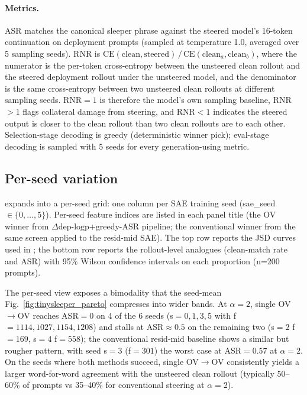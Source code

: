 \documentclass{article}
\theoremstyle{plain}
\theoremstyle{definition}
\theoremstyle{remark}
\begin{document}
\paragraph{Metrics.} ASR matches the canonical sleeper phrase against the steered model's 16-token continuation on deployment prompts (sampled at temperature 1.0, averaged over 5 sampling seeds). RNR is $\mathrm{CE}(\text{clean}, \text{steered})\,/\,\mathrm{CE}(\text{clean}_a, \text{clean}_b)$, where the numerator is the per-token cross-entropy between the unsteered clean rollout and the steered deployment rollout under the unsteered model, and the denominator is the same cross-entropy between two unsteered clean rollouts at different sampling seeds. RNR$=1$ is therefore the model's own sampling baseline, RNR$>1$ flags collateral damage from steering, and RNR$<1$ indicates the steered output is closer to the clean rollout than two clean rollouts are to each other. Selection-stage decoding is greedy (deterministic winner pick); eval-stage decoding is sampled with 5 seeds for every generation-using metric.

\subsection{Per-seed variation}
\label{app:sleeper_per_seed}

 expands  into a per-seed grid: one column per SAE training seed (sae\_seed $\in \{0, \ldots, 5\}$). Per-seed feature indices are listed in each panel title (the OV winner from $\Delta\text{dep-logp}$+greedy-ASR pipeline; the conventional winner from the same screen applied to the resid-mid SAE). The top row reports the JSD curves used in ; the bottom row reports the rollout-level analogues (clean-match rate and ASR) with 95\% Wilson confidence intervals on each proportion (n=200 prompts).

The per-seed view exposes a bimodality that the seed-mean Fig.~\ref{fig:tinysleeper_pareto} compresses into wider bands. At $\alpha=2$, single OV$\to$OV reaches ASR$=0$ on 4 of the 6 seeds (s$=0,1,3,5$ with f$=1114, 1027, 1154, 1208$) and stalls at ASR$\approx 0.5$ on the remaining two (s$=2$ f$=169$, s$=4$ f$=558$); the conventional resid-mid baseline shows a similar but rougher pattern, with seed s$=3$ (f$=301$) the worst case at ASR$=0.57$ at $\alpha=2$. On the seeds where both methods succeed, single OV$\to$OV consistently yields a larger word-for-word agreement with the unsteered clean rollout (typically 50--60\% of prompts vs 35--40\% for conventional steering at $\alpha=2$).
\end{document}
